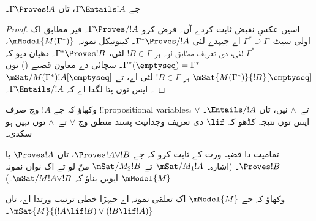 \documentclass[../../../include/open-logic-section]{subfiles}
\begin{document}


\begin{thm}
  جے $\Gamma \Entails !A$، تاں $\Gamma \Proves !A$۔
\end{thm}

\begin{proof}
  اسیں عکسِ نقیض ثابت کردے آں۔ فرض کرو $\Gamma \Proves/ !A$۔ فیر
   مطابق اک اولی سیٹ~$\Gamma^* \supseteq \Gamma$
  اے جیہدے لئی $\Gamma^* \Proves/ !A$۔ کینونیکل نمونہ~$\mModel{M(\Gamma^*)}$،
  $\Gamma^*$ لئی،  دی تعریف مطابق لو۔
  ہر $!B \in \Gamma$ لئی، $\Gamma^* \Proves !B$۔ دھیان دیو کہ
  $\Gamma^*(\emptyseq) = \Gamma^*$۔ سچائی دے معاون قضیے
  () توں $\mSat{M(\Gamma^*)}{!B}[\emptyseq]$
  ہر $!B \in \Gamma$ لئی اے، تے $\mSat/{M(\Gamma^*)}{!A}[\emptyseq]$۔
  ایس توں پتا لگدا اے کہ $\Gamma \Entails/ !A$۔
\end{proof}

\begin{prob}
  وکھاؤ کہ جے $!A$ وچ صرف !!{propositional variable}s، $\lor$ تے~$\land$
  نیں، تاں $\Entails/ !A$۔ ایس توں نتیجہ کڈھو کہ $\lif$ دی تعریف
  وجدانیت پسند منطق وچ $\lor$ تے~$\land$ توں نہیں ہو سکدی۔
\end{prob}

\begin{prob}
  تمامیت دا قضیہ ورت کے ثابت کرو کہ جے $\Proves !A \lor !B$، تاں
  $\Proves !A$ یا $\Proves !B$۔ (اشارہ۔ $\mSat/{M_1}{!A}$ تے
  $\mSat/{M_2}{!B}$ منّ لو تے اک نواں نمونہ $\mModel{M}$ ایویں بناؤ کہ
  $\mSat/{M}{!A \lor !B}$۔)
\end{prob}

\begin{prob}
  وکھاؤ کہ جے $\mModel{M}$ اک تعلقی نمونہ اے جیہڑا خطی ترتیب ورتدا اے،
  تاں $\mSat{M}{(!A \lif !B)\lor(!B \lif !A)}$۔
\end{prob}
\end{document}
